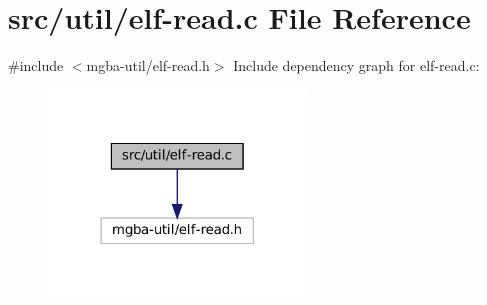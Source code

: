 \hypertarget{elf-read_8c}{}\section{src/util/elf-\/read.c File Reference}
\label{elf-read_8c}
{\ttfamily \#include $<$mgba-\/util/elf-\/read.\+h$>$}\newline
Include dependency graph for elf-\/read.c\+:
\nopagebreak
\begin{figure}[H]
\begin{center}
\leavevmode
\includegraphics[width=194pt]{elf-read_8c__incl}
\end{center}
\end{figure}
